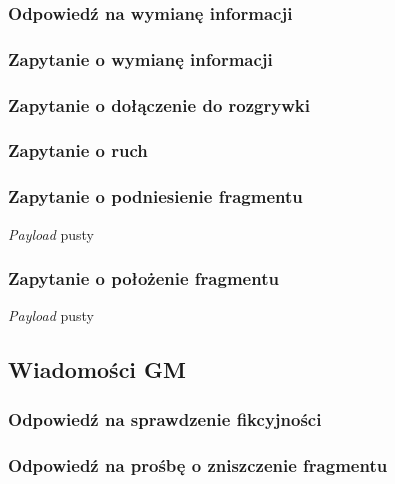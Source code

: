 \documentclass[Dokumentacja.tex]{subfiles}
\begin{document}
\subsubsection{Odpowiedź na wymianę informacji}


\subsubsection{Zapytanie o wymianę informacji}


\subsubsection{Zapytanie o dołączenie do rozgrywki}


\subsubsection{Zapytanie o ruch}


\subsubsection{Zapytanie o podniesienie fragmentu}
\textit{Payload} pusty


\subsubsection{Zapytanie o położenie fragmentu}
\textit{Payload} pusty



\subsection{Wiadomości GM}
\subsubsection{Odpowiedź na sprawdzenie fikcyjności}


\subsubsection{Odpowiedź na prośbę o zniszczenie fragmentu}

\end{document}
